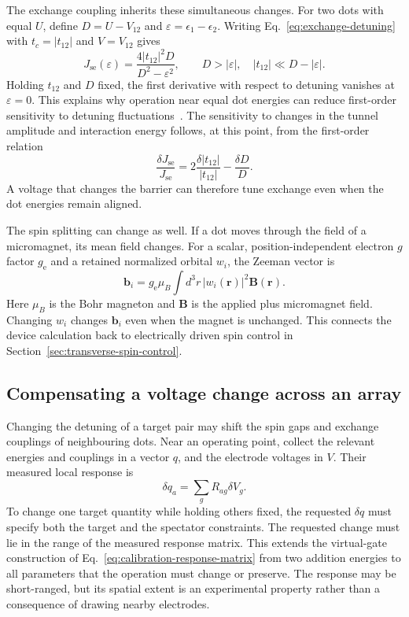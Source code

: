 The exchange coupling inherits these simultaneous changes.
For two dots with equal $U$, define
$D=U-V_{12}$ and $\varepsilon=\epsilon_1-\epsilon_2$.
Writing Eq.~\eqref{eq:exchange-detuning} with
$t_c=|t_{12}|$ and $V=V_{12}$ gives
\begin{equation}
 J_{\mathrm{se}}(\varepsilon)
    =\frac{4|t_{12}|^2D}{D^2-\varepsilon^2},
 \qquad D>|\varepsilon|,\quad
 |t_{12}|\ll D-|\varepsilon|.
 \label{eq:device-exchange-control}
\end{equation}
Holding $t_{12}$ and $D$ fixed, the first derivative with respect
to detuning vanishes at $\varepsilon=0$.
This explains why operation near equal dot energies can reduce
first-order sensitivity to detuning fluctuations~\cite{Reed2016}.
The sensitivity to changes in the tunnel amplitude and
interaction energy follows, at this point, from the first-order relation
\begin{equation}
 \frac{\delta J_{\mathrm{se}}}{J_{\mathrm{se}}}
       =2\frac{\delta|t_{12}|}{|t_{12}|}
          -\frac{\delta D}{D}.
 \label{eq:device-exchange-sensitivity}
\end{equation}
A voltage that changes the barrier can therefore tune exchange
even when the dot energies remain aligned.

The spin splitting can change as well. If a dot moves through
the field of a micromagnet, its mean field changes. For a scalar,
position-independent electron $g$ factor $g_{\mathrm e}$ and a
retained normalized orbital $w_i$, the Zeeman vector is
\begin{equation}
 \mathbf b_i
    =g_{\mathrm e}\mu_B\int d^3r\,|w_i(\mathbf r)|^2\mathbf B(\mathbf r).
 \label{eq:device-averaged-zeeman}
\end{equation}
Here $\mu_B$ is the Bohr magneton and $\mathbf B$ is the applied
plus micromagnet field.
Changing $w_i$ changes $\mathbf b_i$ even when the magnet is
unchanged. This connects the device calculation back to
electrically driven spin control in Section~\ref{sec:transverse-spin-control}.



\subsection{Compensating a voltage change across an array}
\label{sec:processor-array-compensation}

Changing the detuning of a target pair may shift the spin gaps
and exchange couplings of neighbouring dots. Near an operating point,
collect the relevant energies and couplings in a vector \(q\),
and the electrode voltages in \(V\). Their measured local
response is
\[
 \delta q_a=\sum_g R_{ag}\delta V_g.
\]
To change one target quantity while holding others fixed,
the requested \(\delta q\) must specify both the target and
the spectator constraints. The requested change must lie in the
range of the measured response matrix. This extends the virtual-gate construction of
Eq.~\eqref{eq:calibration-response-matrix} from two addition energies
to all parameters that the operation must change or preserve.
The response may be short-ranged, but its spatial extent is an
experimental property rather than a consequence of drawing
nearby electrodes.

